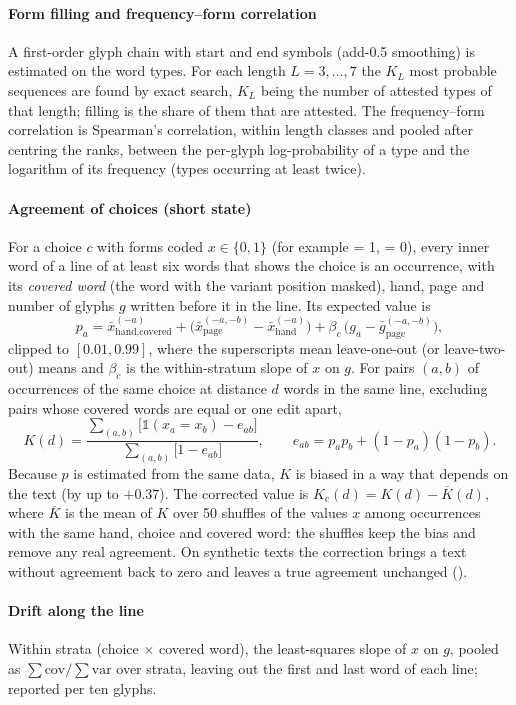 \paragraph{Form filling and frequency--form correlation} A first-order glyph chain with start and end symbols (add-0.5
smoothing) is estimated on the word types. For each length $L = 3,\dots,7$ the $K_L$ most probable sequences are found
by exact search, $K_L$ being the number of attested types of that length; filling is the share of them that are attested.
The frequency--form correlation is Spearman's correlation, within length classes and pooled after centring the ranks,
between the per-glyph log-probability of a type and the logarithm of its frequency (types occurring at least twice).

\paragraph{Agreement of choices (short state)} For a choice $c$ with forms coded $x \in \{0,1\}$ (for example  = 1,
 = 0), every inner word of a line of at least six words that shows the choice is an occurrence, with its
\emph{covered word} (the word with the variant position masked), hand, page and number of glyphs $g$ written before it in
the line. Its expected value is
\[
p_a = \bar x_{\text{hand,covered}}^{(-a)} + \big(\bar x_{\text{page}}^{(-a,-b)} - \bar x_{\text{hand}}^{(-a)}\big)
      + \beta_c\,\big(g_a - \bar g_{\text{page}}^{(-a,-b)}\big),
\]
clipped to $[0.01, 0.99]$, where the superscripts mean leave-one-out (or leave-two-out) means and $\beta_c$ is the
within-stratum slope of $x$ on $g$. For pairs $(a,b)$ of occurrences of the same choice at distance $d$ words in the same
line, excluding pairs whose covered words are equal or one edit apart,
\[
K(d) = \frac{\sum_{(a,b)} \big[\mathbb{1}(x_a = x_b) - e_{ab}\big]}{\sum_{(a,b)} \big[1 - e_{ab}\big]},\qquad
e_{ab} = p_a p_b + (1-p_a)(1-p_b).
\]
Because $p$ is estimated from the same data, $K$ is biased in a way that depends on the text (by up to $+0.37$). The
corrected value is $K_{\mathrm{c}}(d) = K(d) - \overline{K}(d)$, where $\overline{K}$ is the mean of $K$ over 50 shuffles of
the values $x$ among occurrences with the same hand, choice and covered word: the shuffles keep the bias and remove any
real agreement. On synthetic texts the correction brings a text without agreement back to zero and leaves a true
agreement unchanged ().

\paragraph{Drift along the line} Within strata (choice $\times$ covered word), the least-squares slope of $x$ on $g$,
pooled as $\sum \mathrm{cov} / \sum \mathrm{var}$ over strata, leaving out the first and last word of each line; reported
per ten glyphs.

